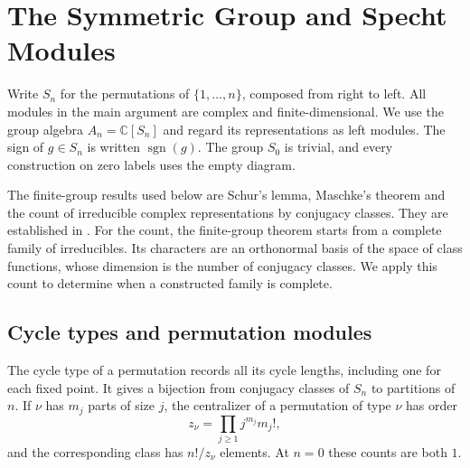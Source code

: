 \chapter[The symmetric group and Specht modules]{The Symmetric Group and Specht Modules}

Write \(S_n\) for the permutations of \(\{1,\ldots,n\}\), composed from
right to left. All modules in the main argument are complex and
finite-dimensional. We use the group algebra \(A_n=\mathbb C[S_n]\) and
regard its representations as left modules. The sign of \(g\in S_n\)
is written \(\operatorname{sgn}(g)\). The group \(S_0\) is trivial, and
every construction on zero labels uses the empty diagram.

The finite-group results used below are Schur's lemma, Maschke's
theorem and the count of irreducible complex representations by
conjugacy classes. They are established in \cite[Chapter 8]{algebra-core}.
For the count, the finite-group theorem starts from a complete family
of irreducibles. Its characters are an orthonormal basis of the space
of class functions, whose dimension is the number of conjugacy classes.
We apply this count to determine when a constructed family is complete.

\section{Cycle types and permutation modules}

\begin{theorem}
\label{res:A01}
The cycle type of a permutation records all its cycle lengths, including
one for each fixed point. It gives a bijection from conjugacy classes of
\(S_n\) to partitions of \(n\). If \(\nu\) has \(m_j\) parts of size \(j\),
the centralizer of a permutation of type \(\nu\) has order
\[
  z_\nu=\prod_{j\geq 1}j^{m_j}m_j!,
\]
and the corresponding class has \(n!/z_\nu\) elements. At \(n=0\) these
counts are both \(1\).
\end{theorem}

